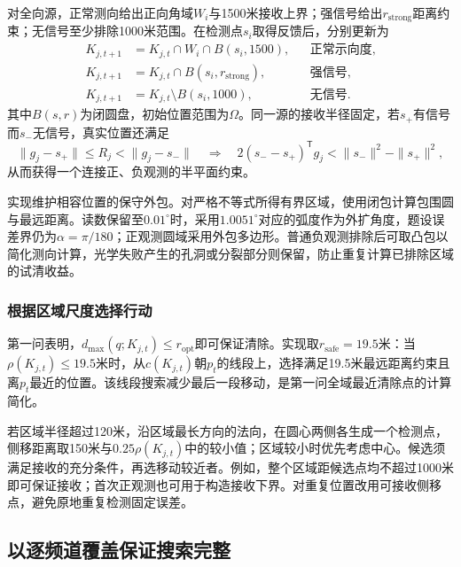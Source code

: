 对全向源，正常测向给出正向角域$W_i$与1500米接收上界；强信号给出$r_{\mathrm{strong}}$距离约束；无信号至少排除1000米范围。在检测点$s_i$取得反馈后，分别更新为
\begin{equation}
\begin{aligned}
 K_{j,t+1}&=K_{j,t}\cap W_i\cap B(s_i,1500), &&\text{正常示向度},\\
 K_{j,t+1}&=K_{j,t}\cap B(s_i,r_{\mathrm{strong}}), &&\text{强信号},\\
 K_{j,t+1}&=K_{j,t}\setminus B(s_i,1000), &&\text{无信号}.
\end{aligned}
\label{eq:q3-update}
\end{equation}
其中$B(s,r)$为闭圆盘，初始位置范围为$\Omega$。同一源的接收半径固定，若$s_+$有信号而$s_-$无信号，真实位置还满足
\begin{equation}
\|g_j-s_+\|\le R_j<\|g_j-s_-\|
\quad\Longrightarrow\quad
2(s_--s_+)^{\mathsf T}g_j<\|s_-\|^2-\|s_+\|^2,
\label{eq:q3-coupling}
\end{equation}
从而获得一个连接正、负观测的半平面约束。

实现维护相容位置的保守外包。对严格不等式所得有界区域，使用闭包计算包围圆与最远距离。读数保留至$0.01^\circ$时，采用$1.0051^\circ$对应的弧度作为外扩角度，题设误差界仍为$\alpha=\pi/180$；正观测圆域采用外包多边形。普通负观测排除后可取凸包以简化测向计算，光学失败产生的孔洞或分裂部分则保留，防止重复计算已排除区域的试清收益。

\subsubsection{根据区域尺度选择行动}

第一问表明，$d_{\max}(q;K_{j,t})\le r_{\mathrm{opt}}$即可保证清除。实现取$r_{\mathrm{safe}}=19.5$米：当$\rho(K_{j,t})\le19.5$米时，从$c(K_{j,t})$朝$p_t$的线段上，选择满足19.5米最远距离约束且离$p_t$最近的位置。该线段搜索减少最后一段移动，是第一问全域最近清除点的计算简化。

若区域半径超过120米，沿区域最长方向的法向，在圆心两侧各生成一个检测点，侧移距离取150米与$0.25\rho(K_{j,t})$中的较小值；区域较小时优先考虑中心。候选须满足接收的充分条件，再选移动较近者。例如，整个区域距候选点均不超过1000米即可保证接收；首次正观测也可用于构造接收下界。对重复位置改用可接收侧移点，避免原地重复检测固定误差。

\subsection{以逐频道覆盖保证搜索完整}

